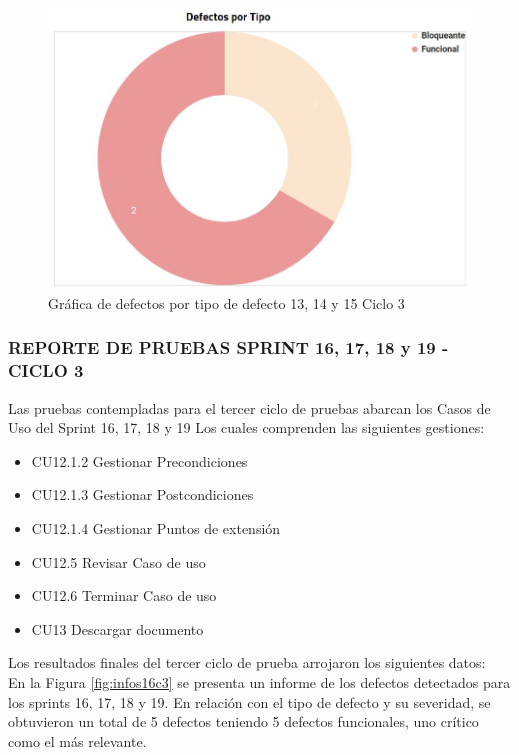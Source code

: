 \begin{figure}[H]
	\begin{center}
		\includegraphics[width=.75\textwidth]{images/pruebas/s13c3-2}
		\caption{Gráfica de defectos por tipo de defecto 13, 14 y 15  Ciclo 3}
		\label{fig:infos13c3-2}
	\end{center}
\end{figure}

\subsubsection{REPORTE DE PRUEBAS SPRINT 16, 17, 18 y 19 - CICLO 3}

Las pruebas contempladas para el tercer ciclo de pruebas abarcan los Casos de Uso del Sprint 16, 17, 18 y 19 Los cuales comprenden las siguientes gestiones:

\begin{itemize}
	\item CU12.1.2 Gestionar Precondiciones 
	\item CU12.1.3 Gestionar Postcondiciones 
	\item CU12.1.4 Gestionar Puntos de extensión
	\item CU12.5 Revisar Caso de uso
	\item CU12.6 Terminar Caso de uso
	\item CU13 Descargar documento
\end{itemize}

Los resultados finales del tercer ciclo de prueba arrojaron los siguientes datos:\\

En la Figura \ref{fig:infos16c3} se presenta un informe de los defectos detectados para los sprints 16, 17, 18 y 19. En relación con el tipo de defecto y su severidad, se obtuvieron un total de 5 defectos teniendo 5 defectos funcionales, uno crítico como el más relevante.

